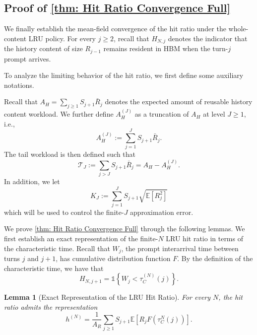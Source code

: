 \documentclass{article}
\newtheorem{lemma}[lemma]{Lemma}
\theoremstyle{definition}
\newcommand{\E}{\mathbb E}
\newcommand{\one}{\mathds{1}}
\begin{document}
\subsection{Proof of \cref{thm: Hit Ratio Convergence Full}}
\label{ssec: Proof of the Full Version of hit ratio conv MCM-LRU short}

We finally establish the mean-field convergence of the  hit ratio under the whole-content LRU policy. For every $j\geq2$, recall that $H_{N,j}$ denotes the indicator that the history content of size $R_{j-1}$ remains resident in HBM when the turn-$j$ prompt arrives.

To analyze the limiting behavior of the hit ratio, we first define some auxiliary notations. 

Recall that $A_H=\sum_{j\geq1}S_{j+1}\bar R_j$ denotes the expected amount of reusable history content workload. We further define $A_H^{(J)}$ as a truncation of $A_H$ at level $J\geq 1$, i.e.,
\begin{equation}
\label{equ: truncated AH J}
    A_H^{(J)}:=\sum_{j=1}^{J}S_{j+1}\bar R_j.
\end{equation}
The tail workload is then defined such that
\begin{equation}
\label{equ: reusable workload tail}
    \mathcal T_J:=\sum_{j>J}S_{j+1}\bar R_j=A_H-A_H^{(J)}.
\end{equation}
In addition, we let 
\begin{equation}
\label{equ: truncated hit second moment constant}
    K_J:=\sum_{j=1}^{J}S_{j+1}\sqrt{\E[R_j^2]}
\end{equation}
which will be used to control the finite-$J$ approximation error.


We prove \cref{thm: Hit Ratio Convergence Full} through the following lemmas. We first establish an exact representation of the finite-$N$ LRU hit ratio in terms of the characteristic time. Recall that $W_j$, the prompt interarrival time between turns $j$ and $j+1$, has cumulative distribution function $F$. By the definition of the characteristic time, we have that
\begin{equation}
\label{equ: hit indicator characteristic time representation}
    H_{N,j+1}=\one\left\{W_j<\tau_C^{(N)}(j)\right\}.
\end{equation}


\begin{lemma}[Exact Representation of the LRU Hit Ratio]
\label{lem: Exact Representation of LRU Hit Probability}
For every $N$, the  hit ratio admits the representation
\begin{equation}
\label{equ: exact LRU hit ratio characteristic representation}
    h ^{(N)} = \frac{1}{A_R}\sum_{j\geq1}S_{j+1}\E\left[R_j F(\tau^{N}_C(j)) \right].
\end{equation}
\end{lemma}
\end{document}
